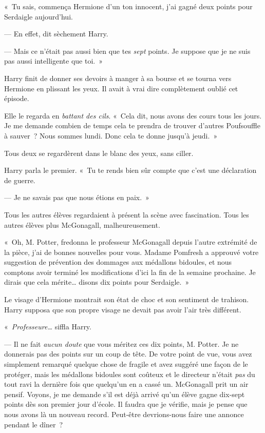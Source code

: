 «~Tu sais, commença Hermione d'un ton innocent, j'ai gagné deux points pour Serdaigle aujourd'hui.

--- En effet, dit sèchement Harry.

--- Mais ce n'était pas aussi bien que tes \emph{sept} points.
Je suppose que je ne suis pas aussi intelligente que toi.~»

Harry finit de donner ses devoirs à manger à sa bourse et se tourna vers Hermione en plissant les yeux.
Il avait à vrai dire complètement oublié cet épisode.

Elle le regarda en \emph{battant des cils}.
«~Cela dit, nous avons des cours tous les jours.
Je me demande combien de temps cela te prendra de trouver d'autres Poufsouffle à sauver~?
Nous sommes lundi.
Donc cela te donne jusqu'à jeudi.~»

Tous deux se regardèrent dans le blanc des yeux, sans ciller.

Harry parla le premier.
«~Tu te rends bien sûr compte que c'est une déclaration de guerre.

--- Je ne savais pas que nous étions en paix.~»

Tous les autres élèves regardaient à présent la scène avec fascination.
Tous les autres élèves plus McGonagall, malheureusement.

«~Oh, M. Potter, fredonna le professeur McGonagall depuis l'autre extrémité de la pièce, j'ai de bonnes nouvelles pour vous.
Madame Pomfresh a approuvé votre suggestion de prévention des dommages aux médallons bidoules, et nous comptons avoir terminé les modifications d'ici la fin de la semaine prochaine.
Je dirais que cela mérite… disons dix points pour Serdaigle.~»

Le visage d'Hermione montrait son état de choc et son sentiment de trahison.
Harry supposa que son propre visage ne devait pas avoir l'air très différent.

«~\emph{Professeure…} siffla Harry.

--- Il ne fait \emph{aucun doute} que vous méritez ces dix points, M. Potter.
Je ne donnerais pas des points sur un coup de tête.
De votre point de vue, vous avez simplement remarqué quelque chose de fragile et avez suggéré une façon de le protéger, mais les médallons bidoules sont coûteux et le directeur n'était \emph{pas} du tout ravi la dernière fois que quelqu'un en a cassé un.
McGonagall prit un air pensif.
Voyons, je me demande s'il est déjà arrivé qu'un élève gagne dix-sept points dès son premier jour d'école.
Il faudra que je vérifie, mais je pense que nous avons là un nouveau record.
Peut-être devrions-nous faire une annonce pendant le dîner~?

